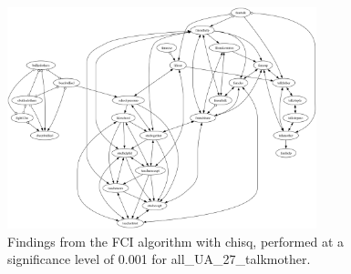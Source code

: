\begin{figure}[htbp]
    \centering
    \includegraphics[width=0.8\textwidth]{Report/final_report/pictures/FCI_chisq_0.001_all_UA_27_talkmother.png}
    \caption{Findings from the FCI algorithm with chisq, performed at a significance level of 0.001 for all_UA_27_talkmother.}
    \label{fig:fci_chisq_0.001all_UA_27_talkmother}
\end{figure}
